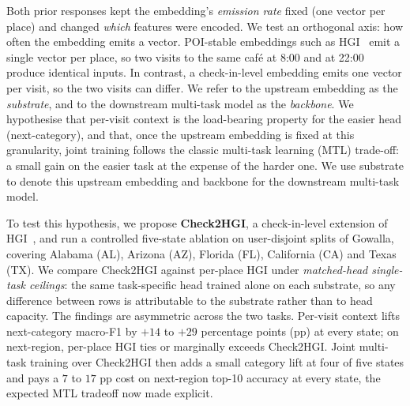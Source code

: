 Both prior responses kept the embedding's \emph{emission rate} fixed (one vector per place) and changed \emph{which} features were encoded. We test an orthogonal axis: how often the embedding emits a vector. POI-stable embeddings such as HGI~\cite{huang2023hgi} emit a single vector per place, so two visits to the same caf\'e at 8:00 and at 22:00 produce identical inputs. In contrast, a check-in-level embedding emits one vector per visit, so the two visits can differ. We refer to the upstream embedding as the \emph{substrate}, and to the downstream multi-task model as the \emph{backbone}. We hypothesise that per-visit context is the load-bearing property for the easier head (next-category), and that, once the upstream embedding is fixed at this granularity, joint training follows the classic multi-task learning (MTL) trade-off: a small gain on the easier task at the expense of the harder one. We use substrate to denote this upstream embedding and backbone for the downstream multi-task model.



To test this hypothesis, we propose \textbf{Check2HGI}, a check-in-level extension of HGI~\cite{huang2023hgi}, and run a controlled five-state ablation on user-disjoint splits of Gowalla, covering Alabama (AL), Arizona (AZ), Florida (FL), California (CA) and Texas (TX). We compare Check2HGI against per-place HGI under \emph{matched-head single-task ceilings}: the same task-specific head trained alone on each substrate, so any difference between rows is attributable to the substrate rather than to head capacity. The findings are asymmetric across the two tasks. Per-visit context lifts next-category macro-F1 by $+14$ to $+29$ percentage points (pp) at every state; on next-region, per-place HGI ties or marginally exceeds Check2HGI. Joint multi-task training over Check2HGI then adds a small category lift at four of five states and pays a $7$ to $17$ pp cost on next-region top-10 accuracy at every state, the expected MTL tradeoff now made explicit.

